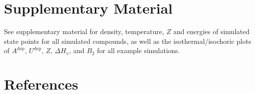 \documentclass[5p,times]{elsarticle}
\begin{document}
\section{Supplementary Material} \label{sec:SupMat} 
See supplementary material for density, temperature, $Z$ and energies of simulated state points for all simulated compounds, as well as the isothermal/isochoric plots of $A^{\mathrm{dep}}$, $U^{\mathrm{dep}}$, $Z$, $\Delta H_{\mathrm{v}}$, and $B_2$ for all example simulations. 

\section{References} \label{sec:ref} 



\end{document}
